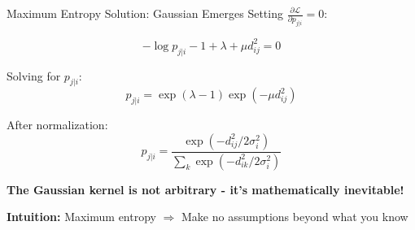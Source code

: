 \documentclass[aspectratio=169]{beamer}
\newcommand{\intuition}[1]{\colorbox{green!10}{\textcolor{intuitioncolor}{\textbf{Intuition:} #1}}}
\begin{document}
\begin{frame}{Maximum Entropy Solution: Gaussian Emerges}
Setting $\frac{\partial\mathcal{L}}{\partial p_{j|i}} = 0$:

$$-\log p_{j|i} - 1 + \lambda + \mu d_{ij}^2 = 0$$

Solving for $p_{j|i}$:
$$p_{j|i} = \exp(\lambda - 1) \exp(-\mu d_{ij}^2)$$

After normalization:
$$p_{j|i} = \frac{\exp(-d_{ij}^2/2\sigma_i^2)}{\sum_k \exp(-d_{ik}^2/2\sigma_i^2)}$$

\begin{center}
\colorbox{yellow!30}{\textbf{The Gaussian kernel is not arbitrary - it's mathematically inevitable!}}
\end{center}

\intuition{Maximum entropy $\Rightarrow$ Make no assumptions beyond what you know}
\end{frame}
\end{document}
